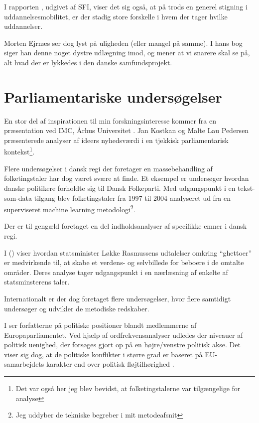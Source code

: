I rapporten , udgivet af SFI, viser det sig også, at på trods en generel stigning i uddannelsesmobilitet, er der stadig store forskelle i hvem der tager hvilke uddannelser.

Morten Ejrnæs ser dog lyst på uligheden (eller mangel på samme).
I hans bog siger han denne noget dystre udlægning imod, og mener at vi snarere skal se på, alt hvad der er lykkedes i den danske samfundsprojekt.

\section{Parliamentariske undersøgelser}\label{sec:review-parl}

En stor del af inspirationen til min forskningsinteresse kommer fra en præsentation ved IMC, Århus Universitet \autocite{interactingmindscentreaarhusuniversityNLPWorkshopIMC2019}. Jan Kostkan og Malte Lau Pedersen præsenterede analyser af ideers nyhedsværdi i en tjekkisk parliamentarisk kontekst\footnote{Det var også her jeg blev bevidst, at folketingstalerne var tilgængelige for analyse}.

Flere undersøgelser i dansk regi der foretager en massebehandling af folketingstaler har dog været svære at finde.
Et eksempel er \citeauthor{hjorthEstablishmentResponsesPopulist, der} undersøger hvordan danske politikere forholdte sig til Dansk Folkeparti.
Med udgangspunkt i en tekst-som-data tilgang blev folketingstaler fra 1997 til 2004 analyseret ud fra en superviseret machine learning metodologi\footnote{Jeg uddyber de tekniske begreber i mit metodeafsnit}.

Der er til gengæld foretaget en del indholdsanalyser af specifikke emner i dansk regi.

I  (\citeyear{andersenTaenkIkkePa2012}) viser \citeauthor{andersenTaenkIkkePa2012} hvordan statsminister Løkke Rasmussens udtalelser omkring “ghettoer” er medvirkende til, at skabe et verdens- og selvbillede for beboere i de omtalte områder.
Deres analyse tager udgangspunkt i en nærlæsning af enkelte af statsminsterens taler.

Internationalt er der dog foretaget flere undersøgelser, hvor flere samtidigt undersøger og udvikler de metodiske redskaber.

I  ser forfatterne på politiske positioner blandt medlemmerne af Europaparliamentet.
Ved hjælp af ordfrekvensanalyser udledes der niveauer af politisk uenighed, der forsøges gjort op på en højre/venstre politisk akse.
Det viser sig dog, at de politiske konflikter i større grad er baseret på EU-samarbejdets karakter end over politisk fløjtilhørighed \autocite{prokschPositionTakingEuropean2010}.

